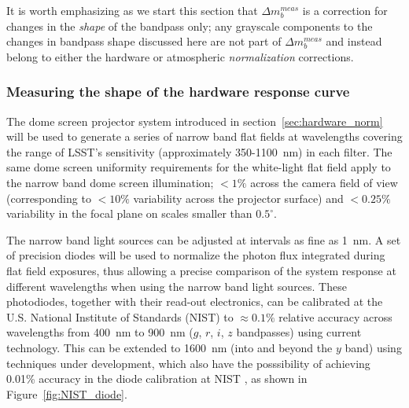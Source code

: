 \documentclass[12pt,preprint]{aastex}
\begin{document}
It is worth emphasizing as we start this section that $\Delta
m_b^{meas}$ is a correction for changes in the {\it shape} of the
bandpass only; any grayscale components to the changes in bandpass
shape discussed here are not part of $\Delta m_b^{meas}$ and instead
belong to either the hardware or atmospheric {\it normalization}
corrections.

\subsubsection{Measuring the shape of the hardware response curve}
\label{sec:hardware_phi}

The dome screen projector system introduced in
section~\ref{sec:hardware_norm} will be used to generate a series of
narrow band flat fields at wavelengths covering the range of LSST's
sensitivity (approximately 350-1100~nm) in each filter.  The same dome
screen uniformity requirements for the white-light flat field apply to
the narrow band dome screen illumination; $<1\%$ across the camera
field of view (corresponding to $<10\%$ variability across the
projector surface) and $<0.25\%$ variability in the focal plane on
scales smaller than $0.5^{\circ}$.

The narrow band light sources can be adjusted at intervals as fine as
1~nm.  A set of precision diodes will be used to normalize the photon
flux integrated during flat field exposures, thus allowing a precise
comparison of the system response at different wavelengths when using
the narrow band light sources.  These photodiodes, together with their
read-out electronics, can be calibrated at the U.S. National Institute
of Standards (NIST) to $\approx0.1\%$ relative accuracy across
wavelengths from 400~nm to 900~nm ($g$, $r$, $i$, $z$ bandpasses)
using current technology.  This can be extended to 1600~nm (into and
beyond the $y$ band) using techniques under development, which also
have the posssibility of achieving 0.01\% accuracy in the diode
calibration at NIST \citep{Eppeldauer09}, as shown in
Figure~\ref{fig:NIST_diode}.
\end{document}
